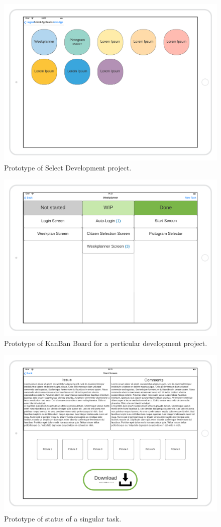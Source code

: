 \begin{figure}[H]
    \centering
        \includegraphics[width=\textwidth]{images/Select-App-Mockup.png}
        \caption{Prototype of Select Development project.}
\end{figure}
\begin{figure}[H]
    \centering
    \includegraphics[width=\textwidth]{images/KanBan-mockup.png}
    \caption{Prototype of KanBan Board for a perticular development project.}
\end{figure}
\begin{figure}[H]
    \centering
    \includegraphics[width=\textwidth]{images/view-a-task-mockup.png}
    \caption{Prototype of status of a singular task.}
    \label{FIG:mockupIssuesComments}
\end{figure}
